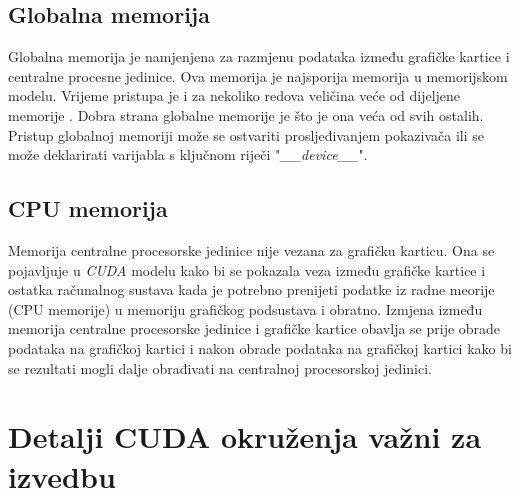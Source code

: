 \documentclass[times, utf8, zavrsni, numeric, sort]{fer}
\begin{document}
\subsection{Globalna memorija}
Globalna memorija je namjenjena za razmjenu podataka između grafičke kartice i centralne procesne jedinice. Ova memorija je najsporija memorija u memorijskom modelu. Vrijeme pristupa je i za nekoliko redova veličina veće od dijeljene memorije \cite{CUDAHOME}. Dobra strana globalne memorije je što je ona veća od svih ostalih. Pristup globalnoj memoriji može se ostvariti prosljeđivanjem pokazivača ili se može deklarirati varijabla s ključnom riječi "\emph{\_\_device\_\_}".

\subsection{CPU memorija}
Memorija centralne procesorske jedinice nije vezana za grafičku karticu. Ona se pojavljuje u \emph{CUDA} modelu kako bi se pokazala veza između grafičke kartice i ostatka računalnog sustava kada je potrebno prenijeti podatke iz radne meorije (CPU memorije) u memoriju grafičkog podsustava i obratno. Izmjena između memorija centralne procesorske jedinice i grafičke kartice obavlja se prije obrade podataka na grafičkoj kartici i nakon obrade podataka na grafičkoj kartici kako bi se rezultati mogli dalje obrađivati na centralnoj procesorskoj jedinici.

\section{Detalji CUDA okruženja važni za izvedbu}
\end{document}
